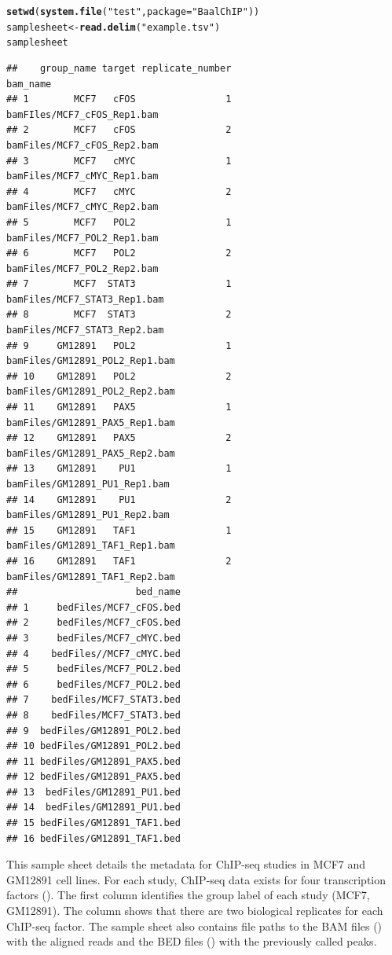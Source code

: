 \documentclass{article}\usepackage[]{graphicx}\usepackage[usenames,dvipsnames]{color}
\makeatletter
\newcommand{\hlstr}[1]{\textcolor[rgb]{0.192,0.494,0.8}{#1}}%
\newcommand{\hlstd}[1]{\textcolor[rgb]{0.345,0.345,0.345}{#1}}%
\newcommand{\hlkwb}[1]{\textcolor[rgb]{0.69,0.353,0.396}{#1}}%
\newcommand{\hlkwc}[1]{\textcolor[rgb]{0.333,0.667,0.333}{#1}}%
\newcommand{\hlkwd}[1]{\textcolor[rgb]{0.737,0.353,0.396}{\textbf{#1}}}%
\newenvironment{kframe}{%
 \def\at@end@of@kframe{}%
 \ifinner\ifhmode%
  \def\at@end@of@kframe{\end{minipage}}%
  \begin{minipage}{\columnwidth}%
 \fi\fi%
 \def\FrameCommand##1{\hskip\@totalleftmargin \hskip-\fboxsep
 \colorbox{shadecolor}{##1}\hskip-\fboxsep
     \hskip-\linewidth \hskip-\@totalleftmargin \hskip\columnwidth}%
 \MakeFramed {\advance\hsize-\width
   \@totalleftmargin\z@ \linewidth\hsize
   \@setminipage}}%
 {\par\unskip\endMakeFramed%
 \at@end@of@kframe}
\newenvironment{knitrout}{}{} %
\makeatother
\begin{document}
\begin{knitrout}
\color{fgcolor}\begin{kframe}
\begin{alltt}
\hlkwd{setwd}\hlstd{(}\hlkwd{system.file}\hlstd{(}\hlstr{"test"}\hlstd{,}\hlkwc{package}\hlstd{=}\hlstr{"BaalChIP"}\hlstd{))}
\hlstd{samplesheet} \hlkwb{<-} \hlkwd{read.delim}\hlstd{(}\hlstr{"example.tsv"}\hlstd{)}
\hlstd{samplesheet}
\end{alltt}
\begin{verbatim}
##    group_name target replicate_number                       bam_name
## 1        MCF7   cFOS                1    bamFIles/MCF7_cFOS_Rep1.bam
## 2        MCF7   cFOS                2    bamFiles/MCF7_cFOS_Rep2.bam
## 3        MCF7   cMYC                1    bamFiles/MCF7_cMYC_Rep1.bam
## 4        MCF7   cMYC                2    bamFiles/MCF7_cMYC_Rep2.bam
## 5        MCF7   POL2                1    bamFiles/MCF7_POL2_Rep1.bam
## 6        MCF7   POL2                2    bamFiles/MCF7_POL2_Rep2.bam
## 7        MCF7  STAT3                1   bamFiles/MCF7_STAT3_Rep1.bam
## 8        MCF7  STAT3                2   bamFiles/MCF7_STAT3_Rep2.bam
## 9     GM12891   POL2                1 bamFiles/GM12891_POL2_Rep1.bam
## 10    GM12891   POL2                2 bamFiles/GM12891_POL2_Rep2.bam
## 11    GM12891   PAX5                1 bamFiles/GM12891_PAX5_Rep1.bam
## 12    GM12891   PAX5                2 bamFiles/GM12891_PAX5_Rep2.bam
## 13    GM12891    PU1                1  bamFiles/GM12891_PU1_Rep1.bam
## 14    GM12891    PU1                2  bamFiles/GM12891_PU1_Rep2.bam
## 15    GM12891   TAF1                1 bamFiles/GM12891_TAF1_Rep1.bam
## 16    GM12891   TAF1                2 bamFiles/GM12891_TAF1_Rep2.bam
##                     bed_name
## 1     bedFiles/MCF7_cFOS.bed
## 2     bedFiles/MCF7_cFOS.bed
## 3     bedFiles/MCF7_cMYC.bed
## 4    bedFiles//MCF7_cMYC.bed
## 5     bedFiles/MCF7_POL2.bed
## 6     bedFiles/MCF7_POL2.bed
## 7    bedFiles/MCF7_STAT3.bed
## 8    bedFiles/MCF7_STAT3.bed
## 9  bedFiles/GM12891_POL2.bed
## 10 bedFiles/GM12891_POL2.bed
## 11 bedFiles/GM12891_PAX5.bed
## 12 bedFiles/GM12891_PAX5.bed
## 13  bedFiles/GM12891_PU1.bed
## 14  bedFiles/GM12891_PU1.bed
## 15 bedFiles/GM12891_TAF1.bed
## 16 bedFiles/GM12891_TAF1.bed
\end{verbatim}
\end{kframe}
\end{knitrout}

This sample sheet details the metadata for ChIP-seq studies in MCF7 and GM12891 cell lines. For each study, ChIP-seq data exists for four transcription factors (). The first column  identifies the group label of each study (MCF7, GM12891). The column  shows that there are two biological replicates for each ChIP-seq factor. The sample sheet also contains file paths to the BAM files () with the aligned reads and the BED files () with the previously called peaks. 
\end{document}
